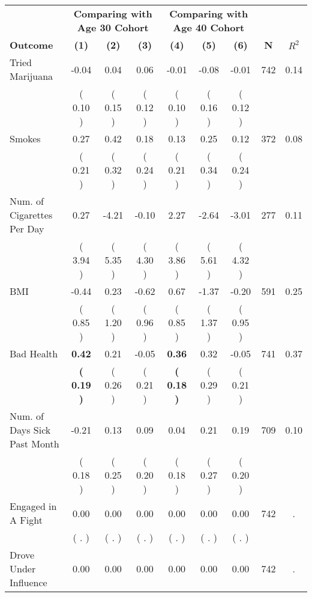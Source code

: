 \begin{tabular}{lcccccccc}
\toprule
 & \multicolumn{3}{c}{\textbf{Comparing with Age 30 Cohort}} & \multicolumn{3}{c}{\textbf{Comparing with Age 40 Cohort}} & \\
\cmidrule(lr){2-4} \cmidrule(lr){5-7} 
 \textbf{Outcome} & \textbf{(1)} & \textbf{(2)} & \textbf{(3)} & \textbf{(4)} & \textbf{(5)} & \textbf{(6)} & \textbf{N} & \textbf{$ R^2$} \\
\midrule
Tried Marijuana &     -0.04 &      0.04 &      0.06 &     -0.01 &     -0.08 &     -0.01 & 742 &       0.14 \\ 
 & (     0.10 ) & (     0.15 ) & (     0.12 ) & (     0.10 ) & (     0.16 ) & (     0.12 ) & \\
Smokes &      0.27 &      0.42 &      0.18 &      0.13 &      0.25 &      0.12 & 372 &       0.08 \\ 
 & (     0.21 ) & (     0.32 ) & (     0.24 ) & (     0.21 ) & (     0.34 ) & (     0.24 ) & \\
Num. of Cigarettes Per Day &      0.27 &     -4.21 &     -0.10 &      2.27 &     -2.64 &     -3.01 & 277 &       0.11 \\ 
 & (     3.94 ) & (     5.35 ) & (     4.30 ) & (     3.86 ) & (     5.61 ) & (     4.32 ) & \\
BMI &     -0.44 &      0.23 &     -0.62 &      0.67 &     -1.37 &     -0.20 & 591 &       0.25 \\ 
 & (     0.85 ) & (     1.20 ) & (     0.96 ) & (     0.85 ) & (     1.37 ) & (     0.95 ) & \\
Bad Health & \textbf{     0.42} &      0.21 &     -0.05 & \textbf{     0.36} &      0.32 &     -0.05 & 741 &       0.37 \\ 
 & \textbf{(     0.19 )} & (     0.26 ) & (     0.21 ) & \textbf{(     0.18 )} & (     0.29 ) & (     0.21 ) & \\
Num. of Days Sick Past Month &     -0.21 &      0.13 &      0.09 &      0.04 &      0.21 &      0.19 & 709 &       0.10 \\ 
 & (     0.18 ) & (     0.25 ) & (     0.20 ) & (     0.18 ) & (     0.27 ) & (     0.20 ) & \\
Engaged in A Fight &      0.00 &      0.00 &      0.00 &      0.00 &      0.00 &      0.00 & 742 &          . \\ 
 & (        . ) & (        . ) & (        . ) & (        . ) & (        . ) & (        . ) & \\
Drove Under Influence &      0.00 &      0.00 &      0.00 &      0.00 &      0.00 &      0.00 & 742 &          . \\ 

\end{tabular}
